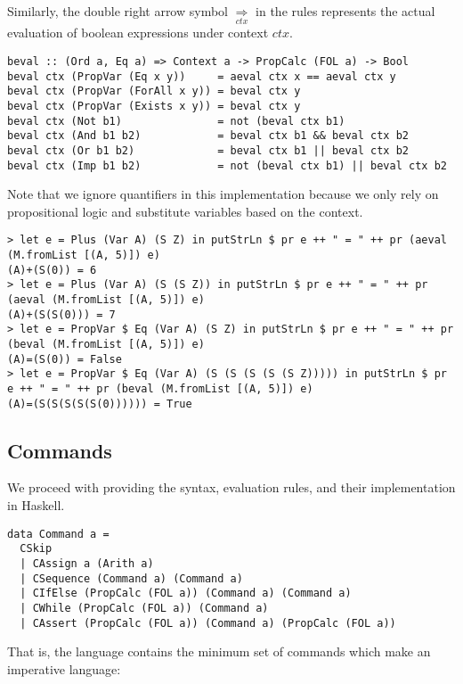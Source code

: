 \documentclass{article}
\begin{document}
Similarly, the double right arrow symbol $\underset{ctx}{\Rightarrow}$ in the rules represents the actual evaluation of boolean expressions under context $ctx$.

\begin{lstlisting}
beval :: (Ord a, Eq a) => Context a -> PropCalc (FOL a) -> Bool
beval ctx (PropVar (Eq x y))     = aeval ctx x == aeval ctx y
beval ctx (PropVar (ForAll x y)) = beval ctx y
beval ctx (PropVar (Exists x y)) = beval ctx y
beval ctx (Not b1)               = not (beval ctx b1)
beval ctx (And b1 b2)            = beval ctx b1 && beval ctx b2
beval ctx (Or b1 b2)             = beval ctx b1 || beval ctx b2
beval ctx (Imp b1 b2)            = not (beval ctx b1) || beval ctx b2
\end{lstlisting}

Note that we ignore quantifiers in this implementation because we only rely on propositional logic and substitute variables based on the context.

\begin{lstlisting}
> let e = Plus (Var A) (S Z) in putStrLn $ pr e ++ " = " ++ pr (aeval (M.fromList [(A, 5)]) e)
(A)+(S(0)) = 6
> let e = Plus (Var A) (S (S Z)) in putStrLn $ pr e ++ " = " ++ pr (aeval (M.fromList [(A, 5)]) e)
(A)+(S(S(0))) = 7
> let e = PropVar $ Eq (Var A) (S Z) in putStrLn $ pr e ++ " = " ++ pr (beval (M.fromList [(A, 5)]) e)
(A)=(S(0)) = False
> let e = PropVar $ Eq (Var A) (S (S (S (S (S Z))))) in putStrLn $ pr e ++ " = " ++ pr (beval (M.fromList [(A, 5)]) e)
(A)=(S(S(S(S(S(0)))))) = True
\end{lstlisting}

\subsection{Commands}

We proceed with providing the syntax, evaluation rules, and their implementation in Haskell.

\begin{lstlisting}
data Command a =
  CSkip
  | CAssign a (Arith a)
  | CSequence (Command a) (Command a)
  | CIfElse (PropCalc (FOL a)) (Command a) (Command a)
  | CWhile (PropCalc (FOL a)) (Command a)
  | CAssert (PropCalc (FOL a)) (Command a) (PropCalc (FOL a))
\end{lstlisting}

That is, the language contains the minimum set of commands which make an imperative language:
\end{document}

